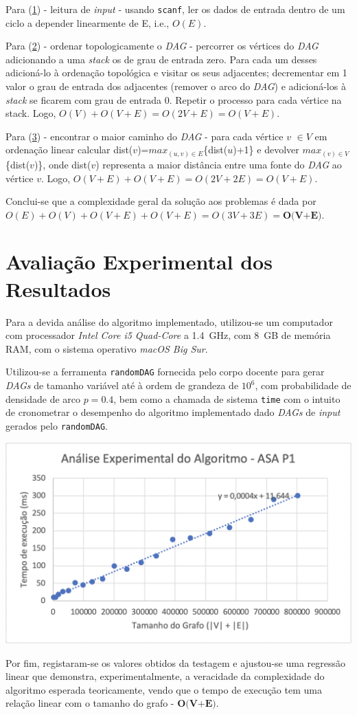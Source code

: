 \documentclass[12pt]{article}
\begin{document}
Para (\underline{1}) - leitura de \emph{input} - usando \texttt{scanf}, ler os dados de entrada dentro de um ciclo a depender linearmente de E, i.e., $O(E)$.

Para (\underline{2}) - ordenar topologicamente o \emph{DAG} - percorrer os vértices do \emph{DAG} adicionando a uma \emph{stack} os de grau de entrada zero. Para cada um desses adicioná-lo à ordenação topológica e visitar os seus adjacentes; decrementar em 1 valor o grau de entrada dos adjacentes (remover o arco do \emph{DAG}) e adicioná-los à \emph{stack} se ficarem com grau de entrada 0. Repetir o processo para cada vértice na stack. Logo, $O(V) + O(V+E) = O(2V+E) = O(V+E)$.

Para (\underline{3}) - encontrar o maior caminho do \emph{DAG} - para cada vértice $v$ $\in{V}$ em ordenação linear calcular dist($v$)=$max_{(u,v)\in{E}}$\{dist($u$)+1\} e devolver $max_{(v)\in{V}}$\{dist($v$)\}, onde dist($v$) representa a maior distância entre uma fonte do \emph{DAG} ao vértice $v$. Logo, $O(V+E)+O(V+E) = O(2V+2E) = O(V+E)$.

Conclui-se que a complexidade geral da solução aos problemas é dada por $O(E)+O(V)+O(V+E)+O(V+E) = O(3V+3E) = \textbf{O(V+E)}$.

\section{Avaliação Experimental dos Resultados}
Para a devida análise do algoritmo implementado, utilizou-se um computador com processador \emph{Intel Core i5 Quad-Core} a \SI{1,4}{GHz}, com \SI{8}{GB} de memória RAM, com o sistema operativo \emph{macOS Big Sur}.

Utilizou-se a ferramenta \texttt{randomDAG} fornecida pelo corpo docente para gerar \emph{DAGs} de tamanho variável até à ordem de grandeza de $10^6$, com probabilidade de densidade de arco $p=0.4$, bem como a chamada de sistema \texttt{time} com o intuito de cronometrar o desempenho do algoritmo implementado dado \emph{DAGs} de \emph{input} gerados pelo \texttt{randomDAG}.

\begin{center}
\includegraphics[width=\linewidth]{reglinear.png}
\end{center}	

Por fim, registaram-se os valores obtidos da testagem e ajustou-se uma regressão linear que demonstra, experimentalmente, a veracidade da complexidade do algoritmo esperada teoricamente, vendo que o tempo de execução tem uma relação linear com o tamanho do grafo - $\textbf{O(V+E)}$.
\end{document}
